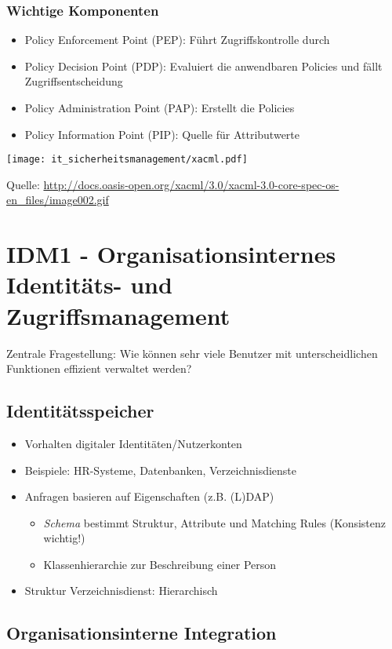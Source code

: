 \subsubsection{Wichtige Komponenten}
\begin{itemize}
	\item Policy Enforcement Point (PEP): Führt Zugriffskontrolle durch
	\item Policy Decision Point (PDP): Evaluiert die anwendbaren Policies und fällt Zugriffsentscheidung
	\item Policy Administration Point (PAP): Erstellt die Policies
	\item Policy Information Point (PIP): Quelle für Attributwerte
\end{itemize}

\texttt{[image: it\_sicherheitsmanagement/xacml.pdf]}

Quelle: \url{http://docs.oasis-open.org/xacml/3.0/xacml-3.0-core-spec-os-en_files/image002.gif}



\section{IDM1 - Organisationsinternes Identitäts- und Zugriffsmanagement}
Zentrale Fragestellung: Wie können sehr viele Benutzer mit unterscheidlichen Funktionen effizient verwaltet werden?

\subsection{Identitätsspeicher}
\begin{itemize}
	\item Vorhalten digitaler Identitäten/Nutzerkonten
	\item Beispiele: HR-Systeme, Datenbanken, Verzeichnisdienste
	\item Anfragen basieren auf Eigenschaften (z.B. (L)DAP)
	\begin{itemize}
		\item \textit{Schema} bestimmt Struktur, Attribute und Matching Rules (Konsistenz wichtig!)
		\item Klassenhierarchie zur Beschreibung einer Person
	\end{itemize}
	\item Struktur Verzeichnisdienst: Hierarchisch
\end{itemize}


\subsection{Organisationsinterne Integration}

